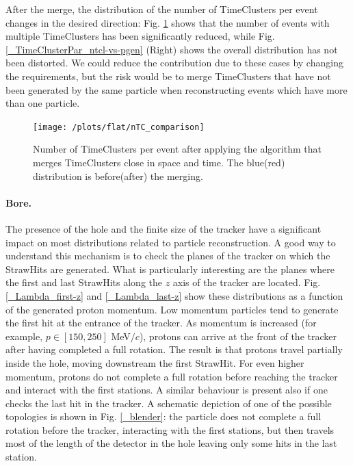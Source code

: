 \documentclass[12pt,a4paper,openright, oneside, titlepage]{book} %
\begin{document}
\noindent After the merge, the distribution of the number of TimeClusters per event changes in the desired direction: 
Fig. \ref{_nTC_comparison} shows that the number of events with multiple TimeClusters has been significantly reduced, while Fig. \ref{_TimeClusterPar_ntcl-vs-pgen} (Right) shows the overall distribution has not been distorted.
We could reduce the contribution due to these cases by changing the requirements, 
but the risk would be to merge TimeClusters that have not been generated
by the same particle when reconstructing events which have more than one particle.

\begin{figure}[h!]
\centering
\texttt{[image: /plots/flat/nTC\_comparison]}
\caption[Number of TimeClusters pre-post merge]
{Number of TimeClusters per event after applying the algorithm 
that merges TimeClusters close in space and time. The blue(red) distribution
is before(after) the merging.}
\label{_nTC_comparison}
\end{figure}

\paragraph{Bore.} 
The presence of the hole and the finite size of the tracker have a significant impact on most distributions related to particle reconstruction.
A good way to understand this mechanism is to check the planes of the tracker 
on which the StrawHits are generated.
What is particularly interesting are the planes where the first and last StrawHits 
along the $z$ axis of the tracker are located. 
Fig. \ref{_Lambda_first-z} and \ref{_Lambda_last-z} show these distributions as a function of the generated proton momentum.
Low momentum particles tend to generate the first hit at the entrance of the tracker. 
As momentum is increased (for example, $p \in [150,250]$ MeV$/c$), 
protons can arrive 
at the front of the tracker after having completed  a full rotation. 
The result is that protons travel partially inside the hole, 
moving downstream the first StrawHit.
For even higher momentum, 
protons do not complete a full rotation before reaching 
the tracker and interact with the first stations.
A similar behaviour is present also if one checks the last hit in the tracker. 
A schematic depiction of one of the possible topologies is shown in Fig. \ref{_blender}: 
the particle does not complete a full rotation before the tracker, 
interacting with the first stations, 
but then travels most of the length of the detector in the hole 
leaving only some hits in the last station.
\end{document}
